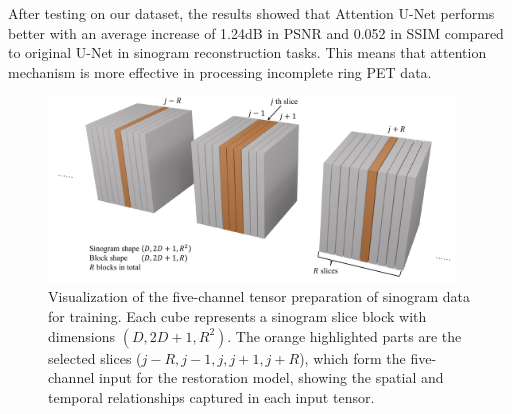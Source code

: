\documentclass[
reprint,
superscriptaddress,
nofootinbib,
amsmath,amssymb,
aps,
prd,
]{revtex4-2}
\begin{document}

After testing on our dataset, the results showed that Attention U-Net performs better with an average increase of 1.24dB in PSNR and 0.052 in SSIM compared to original U-Net in sinogram reconstruction tasks. This means that attention mechanism is more effective in processing incomplete ring PET data.



\begin{figure}[htbp]
\centering
\vspace{-.3cm}
\includegraphics[width=0.96\textwidth]{Images/slices.pdf}
\vspace{-.3cm}
\caption{Visualization of the five-channel tensor preparation of sinogram data for training. Each cube represents a sinogram slice block with dimensions $(D, 2D+1, R^2)$. The orange highlighted parts are the selected slices ($j-R, j-1, j, j+1, j+R$), which form the five-channel input for the restoration model, showing the spatial and temporal relationships captured in each input tensor.}
\label{fig:sinogram_structure}
\end{figure}


\end{document}
